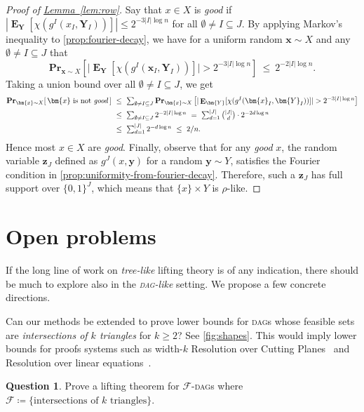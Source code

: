\documentclass[11pt]{article}
\numberwithin{equation}{section}
\theoremstyle{definition}
\newtheorem{question}[theorem]{Question}
\theoremstyle{plain}
\newcommand{\expref}[2]{\hyperref[#2]{#1~\ref{#2}}}
\renewcommand{\Pr}{\mathbf{Pr}}
\DeclareMathOperator{\Ex}{\mathbf{E}}
\newcommand{\DAG}{\textsc{dag}}
\newcommand{\DAGs}{\textsc{dag}s\xspace}
\newcommand{\x}{\bm{x}}
\newcommand{\y}{\bm{y}}
\newcommand{\z}{\bm{z}}
\newcommand{\Y}{\bm{Y}}
\newcommand{\calF}{\mathcal{F}}
\newcommand{\bit}{\{0,1\}}
\begin{document}
\begin{proof}[Proof of {\expref{Lemma}{lem:row}}]
Say that $x \in X$ is \emph{good} if $|\Ex_{\Y}[\chi(g^I(x_I,\Y_I))]| \le 2^{-3 |I| \log n}$ for all $\emptyset\neq I \subseteq J$. By applying Markov's inequality to \autoref{prop:fourier-decay}, we have for a uniform random $\x \sim X$ and any $\emptyset\neq I \subseteq J$ that
\[
\Pr_{\x \sim X} \left [ \big|\Ex_{\Y}[\chi(g^I(\x_I,\Y_I))]\big| > 2^{-3 |I| \log n} \right ]~\le~2^{-2 |I| \log n}.
\]
Taking a union bound over all $\emptyset\neq I\subseteq J$, we get
\begin{align*}
	\textstyle \Pr_{\x \sim X}[\,\x \text{ is not \emph{good}}\,]
	~&\textstyle \le~ \sum_{\emptyset \ne I \subseteq J}\Pr_{\x \sim X} \left [ |\Ex_{\Y}[\chi(g^I(\x_I,\Y_I))]| > 2^{-3 |I| \log n} \right ]\\
	~&\textstyle \le~ \sum_{\emptyset \ne I \subseteq J} 2^{-2 |I| \log n}
	~=~ \sum_{d=1}^{|J|} \binom{|J|}{d} \cdot 2^{-2d \log n}\\
	~&\textstyle \le~ \sum_{d=1}^{|J|} 2^{-d \log n}
	~\le~ 2/n.
\end{align*}
Hence most $x \in X$ are \emph{good}. Finally, observe that for any \emph{good} $x$, the random variable $\z_J$ defined as $g^J(x,\y)$ for a random $\y \sim Y$, satisfies the Fourier condition in \autoref{prop:uniformity-from-fourier-decay}. Therefore, such a $\z_J$ has full support over $\bit^J$, which means that $\{x\} \times Y$ is $\rho$-like.
\end{proof}


\section{Open problems} \label{sec:open}

If the long line of work on \emph{tree-like} lifting theory is of any indication, there should be much to explore also in the \emph{\DAG-like} setting. We propose a few concrete directions.

Can our methods be extended to prove lower bounds for \DAGs whose feasible sets are \emph{intersections of $k$ triangles} for $k\geq 2$? See \autoref{fig:shapes}. This would imply lower bounds for proofs systems such as width-$k$ Resolution over Cutting Planes~\cite{krajicek98discretely} and Resolution over linear equations~\cite{raz08resolution,itsykson14lower}.
\begin{question}
Prove a lifting theorem for $\calF$-\DAGs where $\calF\coloneqq\{\text{intersections of $k$ triangles}\}$.
\end{question}
\end{document}
